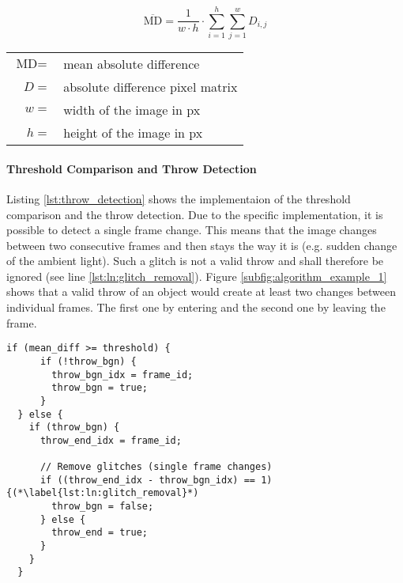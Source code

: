 \begin{equation}
  \overline{\text{MD}} = \frac{1}{w\cdot h} \cdot \sum\limits_{i=1}^h \sum\limits_{j=1}^w D_{i,j}
  \label{eq:mean_diff}
\end{equation}

\begin{tabular}{rl}
  $\text{MD} =$ & mean absolute difference \\
  $D =$ & absolute difference pixel matrix \\
  $w =$ & width of the image in px \\
  $h =$ & height of the image in px \\
\end{tabular}

\paragraph{Threshold Comparison and Throw Detection}
Listing \ref{lst:throw_detection} shows the implementaion of the threshold comparison and the throw detection.
Due to the specific implementation, it is possible to detect a single frame change.
This means that the image changes between two consecutive frames and then stays the way it is (e.g. sudden change of the ambient light).
Such a glitch is not a valid throw and shall therefore be ignored (see line \ref{lst:ln:glitch_removal}).
Figure \ref{subfig:algorithm_example_1} shows that a valid throw of an object would create at least two changes between individual frames.
The first one by entering and the second one by leaving the frame.
\vspace{5pt}
\begin{lstlisting}[style=C++, caption={Throw detection and glitch removal}, label=lst:throw_detection]
  if (mean_diff >= threshold) {
      if (!throw_bgn) {
        throw_bgn_idx = frame_id;
        throw_bgn = true;
      }
  } else {
    if (throw_bgn) {
      throw_end_idx = frame_id;

      // Remove glitches (single frame changes)
      if ((throw_end_idx - throw_bgn_idx) == 1) {(*\label{lst:ln:glitch_removal}*)
        throw_bgn = false;
      } else {
        throw_end = true;
      }
    }
  }
\end{lstlisting}

